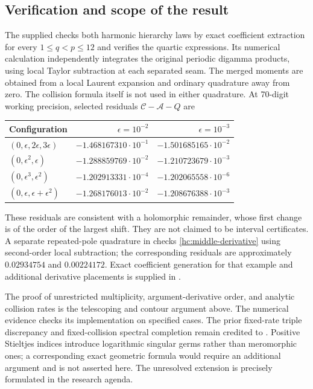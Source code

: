 \subsection{Verification and scope of the result}

The supplied  checks both harmonic
hierarchy laws by exact coefficient extraction for every
$1\le q<p\le12$ and verifies the quartic expressions. Its numerical
calculation independently integrates the original periodic digamma
products, using local Taylor subtraction at each separated seam. The
merged moments are obtained from a local Laurent expansion and ordinary
quadrature away from zero. The collision formula itself is not used
in either quadrature. At 70-digit working precision, selected residuals
$\mathcal C-\mathcal A-Q$ are
\begin{center}
\begin{tabular}{lrr}
\hline
Configuration & $\epsilon=10^{-2}$ & $\epsilon=10^{-3}$\\
\hline
$(0,\epsilon,2\epsilon,3\epsilon)$
 & $-1.468167310\cdot10^{-1}$ & $-1.501685165\cdot10^{-2}$\\
$(0,\epsilon^2,\epsilon)$
 & $-1.288859769\cdot10^{-2}$ & $-1.210723679\cdot10^{-3}$\\
$(0,\epsilon^3,\epsilon^2)$
 & $-1.202913331\cdot10^{-4}$ & $-1.202065558\cdot10^{-6}$\\
$(0,\epsilon,\epsilon+\epsilon^2)$
 & $-1.268176013\cdot10^{-2}$ & $-1.208676388\cdot10^{-3}$\\
\hline
\end{tabular}
\end{center}
These residuals are consistent with a holomorphic remainder, whose
first change is of the order of the largest shift. They are not claimed
to be interval certificates. A separate repeated-pole quadrature in
 checks
\eqref{hc:middle-derivative} using second-order local subtraction;
the corresponding residuals are approximately $0.02934754$ and
$0.00224172$. Exact coefficient generation for that example and
additional derivative placements is supplied in
.

The proof of unrestricted multiplicity, argument-derivative order, and
analytic collision rates is the telescoping and contour argument above.
The numerical evidence checks its implementation on specified cases.
The prior fixed-rate triple discrepancy and fixed-collision spectral
completion remain credited to \cite{RepoMixed}. Positive Stieltjes
indices introduce logarithmic singular germs rather than meromorphic
ones; a corresponding exact geometric formula would require an
additional argument and is not asserted here. The unresolved extension
is precisely formulated in the research agenda.

